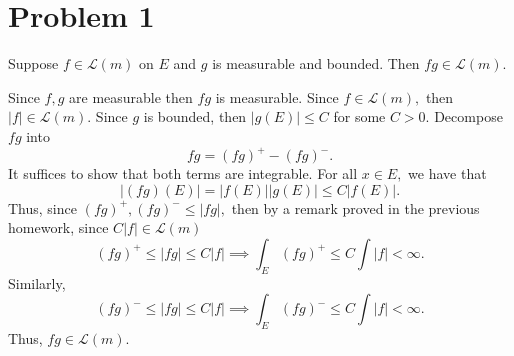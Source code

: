 \documentclass[11pt]{article}
\begin{document}
	
	
	\psetheader

\section*{Problem 1}
\begin{problem}
    Suppose $f \in \mathcal{L}(m)$ on $E$ and $g$ is measurable and bounded. Then $fg \in \mathcal{L}(m).$
\end{problem}
\begin{solution}
Since $f,g$ are measurable then $fg$ is measurable. Since $f \in \mathcal{L}(m),$ then $|f| \in \mathcal{L}(m).$
    Since $g$ is bounded, then $|g(E)| \leq C$ for some $C>0.$ Decompose $fg$ into 
    \[fg = (fg)^+ - (fg)^-.\] It suffices to show that both terms are integrable. For all $x\in E,$ we have that 
    \[|(fg)(E)|  =  |f(E)||g(E)| \leq C|f(E)|.\] Thus, since $(fg)^+, (fg)^- \leq |fg|,$ then by a remark proved in the previous homework, since $C|f|\in \mathcal{L}(m)$ 
    \[(fg)^+ \leq |fg| \leq C|f| \implies \int_E (fg)^+ \leq C\int |f| < \infty.\] Similarly, 
    \[(fg)^- \leq |fg|\leq C|f| \implies \int_E (fg)^- \leq C\int |f| < \infty.\]
    Thus, $fg \in \mathcal{L}(m).$
\end{solution}

\newpage
\end{document}
